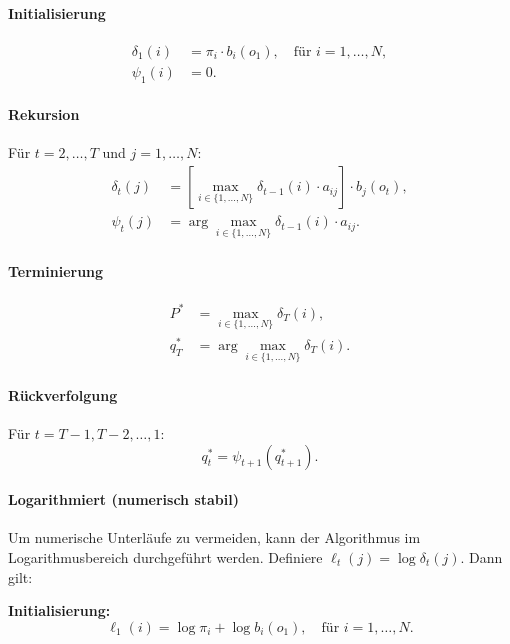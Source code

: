 \paragraph{Initialisierung}
\begin{align}
  \delta_1(i) &= \pi_i \cdot b_i(o_1), \quad \text{für } i = 1, \ldots, N, \\
  \psi_1(i)   &= 0.
\end{align}

\paragraph{Rekursion}
Für $t = 2, \ldots, T$ und $j = 1, \ldots, N$:
\begin{align}
  \delta_t(j) &= \left[\max_{i \in \{1, \ldots, N\}} \delta_{t-1}(i) \cdot a_{ij} \right] \cdot b_j(o_t), \\
  \psi_t(j)   &= \arg\max_{i \in \{1, \ldots, N\}} \delta_{t-1}(i) \cdot a_{ij}.
\end{align}

\paragraph{Terminierung}
\begin{align}
  P^* &= \max_{i \in \{1, \ldots, N\}} \delta_T(i), \\
  q_T^* &= \arg\max_{i \in \{1, \ldots, N\}} \delta_T(i).
\end{align}

\paragraph{Rückverfolgung}
Für $t = T-1, T-2, \ldots, 1$:
\begin{equation}
  q_t^* = \psi_{t+1}(q_{t+1}^*).
\end{equation}

\paragraph{Logarithmiert (numerisch stabil)}
Um numerische Unterläufe zu vermeiden, kann der Algorithmus im Logarithmusbereich durchgeführt werden.
Definiere $\ell_t(j) = \log \delta_t(j)$. Dann gilt:

\textbf{Initialisierung:}
\begin{equation}
  \ell_1(i) = \log \pi_i + \log b_i(o_1), \quad \text{für } i = 1, \ldots, N.
\end{equation}

